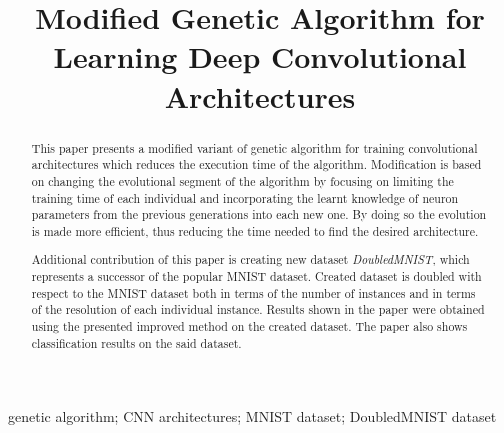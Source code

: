 \documentclass[eng]{simposium}
\begin{document}
\begin{frontmatter}


\title{Modified Genetic Algorithm for Learning Deep Convolutional Architectures}

\author{\textbf{ }}
\address{Faculty of Mathematics, University of Belgrade, Studentski trg 16, 11000 Belgrade\\
}
\author{\textbf{ }}
\address{Microsoft Development Center Serbia, Španskih boraca 3, 11000 Belgrade\\
}
\author{\textbf{ }}
\address{Faculty of Mathematics, University of Belgrade, Studentski trg 16, 11000 Belgrade\\
}


\maketitle
\begin{abstract}

This paper presents a modified variant of genetic algorithm for training convolutional architectures which reduces the execution time of the algorithm.  
Modification is based on changing the evolutional segment of the algorithm by focusing on limiting the training time of each individual and incorporating the  
learnt knowledge of neuron parameters from the previous generations into each new one. By doing so the evolution is made more efficient, thus reducing the time  
needed to find the desired architecture. 

Additional contribution of this paper is creating new dataset \textit{DoubledMNIST}, which represents a successor of the popular MNIST dataset. 
Created dataset is doubled with respect to the MNIST dataset both in terms of the number of instances and in terms of the resolution of each individual instance. 
Results shown in the paper were obtained using the presented improved method on the created dataset. The paper also shows classification results on the said dataset. 
\end{abstract} 

\begin{keyword} 
genetic algorithm; CNN architectures; MNIST dataset; DoubledMNIST dataset 
\end{keyword} 

\end{frontmatter} 
\end{document}
